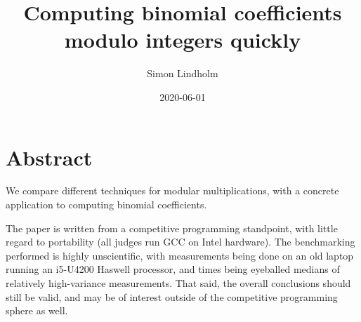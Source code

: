 \documentclass{article}
\title{Computing binomial coefficients modulo integers quickly}
\author{Simon Lindholm}
\date{2020-06-01}
\begin{document}
\maketitle

\section*{Abstract}
We compare different techniques for modular multiplications, with a concrete application to computing binomial coefficients.

The paper is written from a competitive programming standpoint, with little regard to portability (all judges run GCC on Intel hardware).
The benchmarking performed is highly unscientific, with measurements being done on an old laptop running an i5-U4200 Haswell processor,
and times being eyeballed medians of relatively high-variance measurements.
That said, the overall conclusions should still be valid, and may be of interest outside of the competitive programming sphere as well.

\tableofcontents




\end{document}
